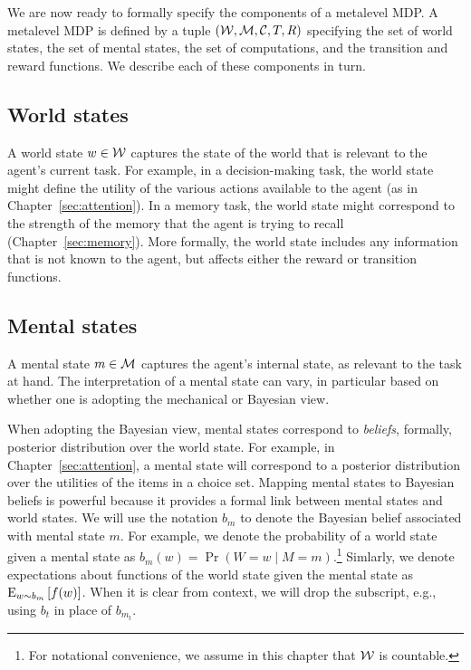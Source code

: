 \separator

We are now ready to formally specify the components of a metalevel MDP. A metalevel MDP is defined by a tuple $(\W, \M, \C, T, R)$ specifying the set of world states, the set of mental states, the set of computations, and the transition and reward functions. We describe each of these components in turn.


\subsection{World states}
A world state $w \in \W$ captures the state of the world that is relevant to the agent's current task. For example, in a decision-making task, the world state might define the utility of the various actions available to the agent (as in Chapter~\ref{sec:attention}). In a memory task, the world state might correspond to the strength of the memory that the agent is trying to recall (Chapter~\ref{sec:memory}). More formally, the world state includes any information that is not known to the agent, but affects either the reward or transition functions.

\subsection{Mental states}

A mental state $m \in \M$ captures the agent's internal state, as relevant to the task at hand. The interpretation of a mental state can vary, in particular based on whether one is adopting the mechanical or Bayesian view. 

When adopting the Bayesian view, mental states correspond to \emph{beliefs}, formally, posterior distribution over the world state. For example, in Chapter~\ref{sec:attention}, a mental state will correspond to a posterior distribution over the utilities of the items in a choice set. Mapping mental states to Bayesian beliefs is powerful because it provides a formal link between mental states and world states. We will use the notation $b_m$ to denote the Bayesian belief associated with mental state $m$. For example, we denote the probability of a world state given a mental state as $b_m(w) = \Pr(W = w \mid M = m)$.\footnote{%
  For notational convenience, we assume in this chapter that $\W$ is countable.
} Simlarly, we denote expectations about functions of the world state given the mental state as $\expectunder{f(w)}{w \sim b_m}$. When it is clear from context, we will drop the subscript, e.g., using $b_t$ in place of $b_{m_t}$. 

